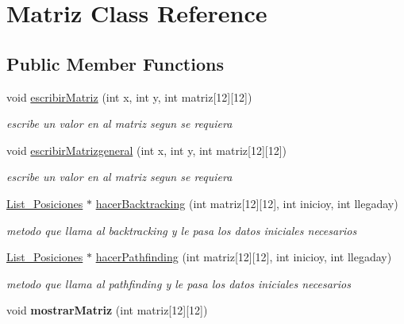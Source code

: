 \hypertarget{classMatriz}{}\section{Matriz Class Reference}
\label{classMatriz}
\subsection*{Public Member Functions}
\begin{DoxyCompactItemize}
\item 
void \hyperlink{classMatriz_a733a7d3965544c1e1debe26a6ba54808}{escribir\+Matriz} (int x, int y, int matriz\mbox{[}12\mbox{]}\mbox{[}12\mbox{]})
\begin{DoxyCompactList}\small\item\em escribe un valor en al matriz segun se requiera \end{DoxyCompactList}\item 
void \hyperlink{classMatriz_ab74d8aed5ec41d306a55f509860edc7e}{escribir\+Matrizgeneral} (int x, int y, int matriz\mbox{[}12\mbox{]}\mbox{[}12\mbox{]})
\begin{DoxyCompactList}\small\item\em escribe un valor en al matriz segun se requiera \end{DoxyCompactList}\item 
\hyperlink{classList__Posiciones}{List\+\_\+\+Posiciones} $\ast$ \hyperlink{classMatriz_ae5786d501d5f490ed990e4d452bb1512}{hacer\+Backtracking} (int matriz\mbox{[}12\mbox{]}\mbox{[}12\mbox{]}, int inicioy, int llegaday)
\begin{DoxyCompactList}\small\item\em metodo que llama al backtracking y le pasa los datos iniciales necesarios \end{DoxyCompactList}\item 
\hyperlink{classList__Posiciones}{List\+\_\+\+Posiciones} $\ast$ \hyperlink{classMatriz_a75a58827e2f1e26f2d1c928c09da3561}{hacer\+Pathfinding} (int matriz\mbox{[}12\mbox{]}\mbox{[}12\mbox{]}, int inicioy, int llegaday)
\begin{DoxyCompactList}\small\item\em metodo que llama al pathfinding y le pasa los datos iniciales necesarios \end{DoxyCompactList}\item 
\mbox{\label{classMatriz_aca4ea10dd5e3ecb04f9a090b956a3ece}} 
void {\bfseries mostrar\+Matriz} (int matriz\mbox{[}12\mbox{]}\mbox{[}12\mbox{]})
\end{DoxyCompactItemize}



